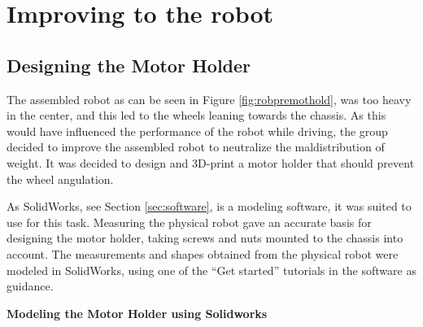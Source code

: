 \section{Improving to the robot}
\label{sec:improvements}

\subsection{Designing the Motor Holder}
The assembled robot as can be seen in Figure \ref{fig:robpremothold}, was too heavy in the center, and this led to the wheels leaning towards the chassis. As this would have influenced the performance of the robot while driving, the group decided to improve the assembled robot to neutralize the maldistribution of weight. It was decided to design and 3D-print a motor holder that should prevent the wheel angulation.

As SolidWorks, see Section \ref{sec:software}, is a modeling software, it was suited to use for this task. Measuring the physical robot gave an accurate basis for designing the motor holder, taking screws and nuts mounted to the chassis into account. The measurements and shapes obtained from the physical robot were modeled in SolidWorks, using one of the ``Get started'' tutorials in the software as guidance.

\textbf{Modeling the Motor Holder using Solidworks}




